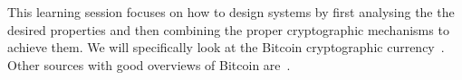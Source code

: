 This learning session focuses on how to design systems by first analysing the 
the desired properties and then combining the proper cryptographic mechanisms 
to achieve them.
We will specifically look at the Bitcoin cryptographic 
currency~\cite{Nakamoto2008bap}.
Other sources with good overviews of Bitcoin 
are~\cite{Peck2012btc,Kaminsky2013lct}.

